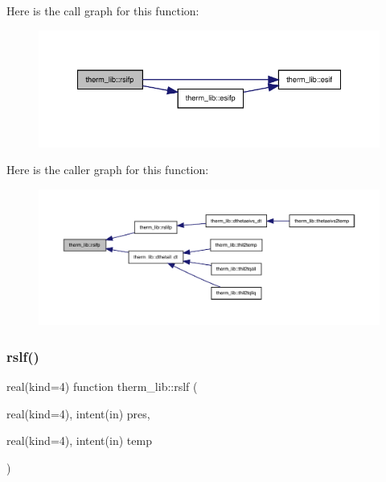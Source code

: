 Here is the call graph for this function\+:
\nopagebreak
\begin{figure}[H]
\begin{center}
\leavevmode
\includegraphics[width=348pt]{namespacetherm__lib_a55d327a08b380623cd2b036cecdef9f2_cgraph}
\end{center}
\end{figure}
Here is the caller graph for this function\+:
\nopagebreak
\begin{figure}[H]
\begin{center}
\leavevmode
\includegraphics[width=350pt]{namespacetherm__lib_a55d327a08b380623cd2b036cecdef9f2_icgraph}
\end{center}
\end{figure}
\mbox{\label{namespacetherm__lib_abd775a071488452f724ab50c60cebe4b}} 
\subsubsection{\texorpdfstring{rslf()}{rslf()}}
{\footnotesize\ttfamily real(kind=4) function therm\+\_\+lib\+::rslf (\begin{DoxyParamCaption}\item[{real(kind=4), intent(in)}]{pres,  }\item[{real(kind=4), intent(in)}]{temp }\end{DoxyParamCaption})}

